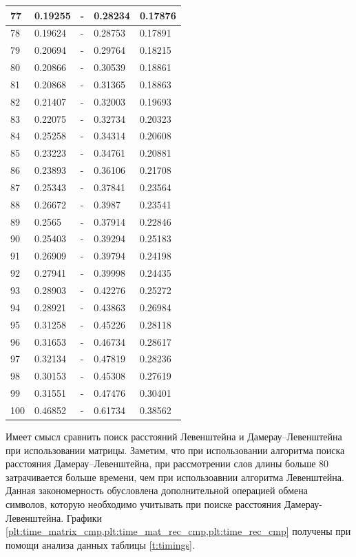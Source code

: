 \begin{table}[!ht]
\begin{tabular}{|l|l|l|l|l|}
        77 & 0.19255 & - & 0.28234 & 0.17876 \\ \hline
        78 & 0.19624 & - & 0.28753 & 0.17891 \\ \hline
        79 & 0.20694 & - & 0.29764 & 0.18215 \\ \hline
        80 & 0.20866 & - & 0.30539 & 0.18861 \\ \hline
        81 & 0.20868 & - & 0.31365 & 0.18863 \\ \hline
        82 & 0.21407 & - & 0.32003 & 0.19693 \\ \hline
        83 & 0.22075 & - & 0.32734 & 0.20323 \\ \hline
        84 & 0.25258 & - & 0.34314 & 0.20608 \\ \hline
        85 & 0.23223 & - & 0.34761 & 0.20881 \\ \hline
        86 & 0.23893 & - & 0.36106 & 0.21708 \\ \hline
        87 & 0.25343 & - & 0.37841 & 0.23564 \\ \hline
        88 & 0.26672 & - & 0.3987 & 0.23541 \\ \hline
        89 & 0.2565 & - & 0.37914 & 0.22846 \\ \hline
        90 & 0.25403 & - & 0.39294 & 0.25183 \\ \hline
        91 & 0.26909 & - & 0.39794 & 0.24198 \\ \hline
        92 & 0.27941 & - & 0.39998 & 0.24435 \\ \hline
        93 & 0.28903 & - & 0.42276 & 0.25272 \\ \hline
        94 & 0.28921 & - & 0.43863 & 0.26984 \\ \hline
        95 & 0.31258 & - & 0.45226 & 0.28118 \\ \hline
        96 & 0.31653 & - & 0.46734 & 0.28617 \\ \hline
        97 & 0.32134 & - & 0.47819 & 0.28236 \\ \hline
        98 & 0.30153 & - & 0.45308 & 0.27619 \\ \hline
        99 & 0.31551 & - & 0.47476 & 0.30401 \\ \hline
        100 & 0.46852 & - & 0.61734 & 0.38562 \\ \hline
    \end{tabular}
\end{table}

Имеет смысл сравнить поиск расстояний Левенштейна и Дамерау--Левенштейна при использовании матрицы. Заметим, что при использовании
алгоритма поиска расстояния Дамерау--Левенштейна, при рассмотрении слов длины больше 80 затрачивается больше времени, чем 
при использоавнии алгоритма Левенштейна. Данная закономерность обусловлена дополнительной операцией обмена символов, которую 
необходимо учитывать при поиске расстояния Дамерау-Левенштейна. Графики \ref{plt:time_matrix_cmp,plt:time_mat_rec_cmp,plt:time_rec_cmp} получены при 
помощи анализа данных таблицы \ref{t:timings}.

